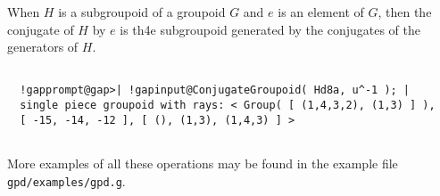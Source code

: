 \documentclass[a4paper,11pt]{report}
\begin{document}
{{{ When $H$ is a subgroupoid of a groupoid $G$ and $e$ is an element of $G$, then the conjugate of $H$ by $e$ is th4e subgroupoid generated by the conjugates of the generators of $H$. }

\begin{Verbatim}[commandchars=!@|,fontsize=\small,frame=single,label=Example]
  
  !gapprompt@gap>| !gapinput@ConjugateGroupoid( Hd8a, u^-1 ); |
  single piece groupoid with rays: < Group( [ (1,4,3,2), (1,3) ] ), 
  [ -15, -14, -12 ], [ (), (1,3), (1,4,3) ] >
  
\end{Verbatim}
 }

 More examples of all these operations may be found in the example file \texttt{gpd/examples/gpd.g}. }

            
\end{document}
